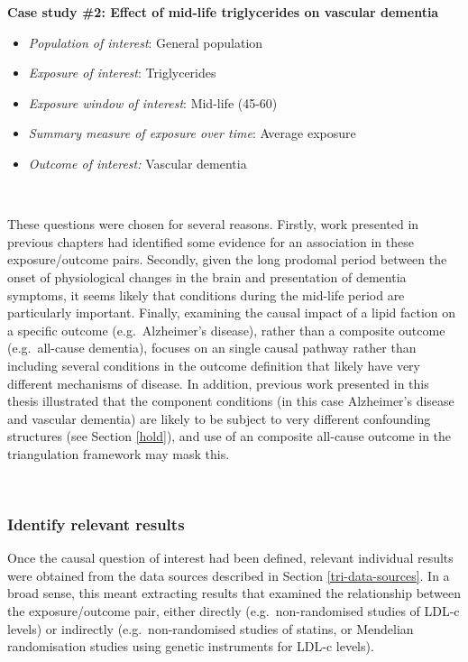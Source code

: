 \documentclass[a4paper, twoside]{templates/ociamthesis}
\providecommand{\tightlist}{%
  \setlength{\itemsep}{0pt}\setlength{\parskip}{0pt}}
\begin{document}
\textbf{Case study \#2: Effect of mid-life triglycerides on vascular dementia}

\begin{itemize}
\tightlist
\item
  \emph{Population of interest}: General population
\item
  \emph{Exposure of interest}: Triglycerides
\item
  \emph{Exposure window of interest}: Mid-life (45-60)
\item
  \emph{Summary measure of exposure over time}: Average exposure
\item
  \emph{Outcome of interest:} Vascular dementia
\end{itemize}

~

These questions were chosen for several reasons. Firstly, work presented in previous chapters had identified some evidence for an association in these exposure/outcome pairs. Secondly, given the long prodomal period between the onset of physiological changes in the brain and presentation of dementia symptoms, it seems likely that conditions during the mid-life period are particularly important. Finally, examining the causal impact of a lipid faction on a specific outcome (e.g.~Alzheimer's disease), rather than a composite outcome (e.g.~all-cause dementia), focuses on an single causal pathway rather than including several conditions in the outcome definition that likely have very different mechanisms of disease. In addition, previous work presented in this thesis illustrated that the component conditions (in this case Alzheimer's disease and vascular dementia) are likely to be subject to very different confounding structures (see Section \ref{hold}), and use of an composite all-cause outcome in the triangulation framework may mask this.

~

\hypertarget{identify-relevant-results}{%
\subsubsection{Identify relevant results}\label{identify-relevant-results}}

Once the causal question of interest had been defined, relevant individual results were obtained from the data sources described in Section \ref{tri-data-sources}. In a broad sense, this meant extracting results that examined the relationship between the exposure/outcome pair, either directly (e.g.~non-randomised studies of LDL-c levels) or indirectly (e.g.~non-randomised studies of statins, or Mendelian randomisation studies using genetic instruments for LDL-c levels).
\end{document}
